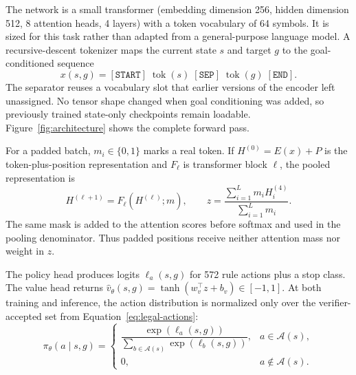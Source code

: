 \documentclass[11pt]{article}
\numberwithin{equation}{section}
\begin{document}
The network is a small transformer (embedding dimension 256, hidden dimension 512, 8 attention heads, 4 layers) with a token vocabulary of 64 symbols. It is sized for this task rather than adapted from a general-purpose language model. A recursive-descent tokenizer maps the current state $s$ and target $g$ to the goal-conditioned sequence
\begin{equation}
x(s,g)=[\texttt{START}]\;\operatorname{tok}(s)\;[\texttt{SEP}]\;\operatorname{tok}(g)\;[\texttt{END}].
\label{eq:input-encoding}
\end{equation}
The separator reuses a vocabulary slot that earlier versions of the encoder left unassigned. No tensor shape changed when goal conditioning was added, so previously trained state-only checkpoints remain loadable. Figure~\ref{fig:architecture} shows the complete forward pass.

For a padded batch, $m_i\in\{0,1\}$ marks a real token. If $H^{(0)}=E(x)+P$ is the token-plus-position representation and $F_\ell$ is transformer block $\ell$, the pooled representation is
\begin{equation}
H^{(\ell+1)}=F_\ell\!\left(H^{(\ell)};m\right),\qquad
z=\frac{\sum_{i=1}^{L}m_i H^{(4)}_i}{\sum_{i=1}^{L}m_i}.
\label{eq:masked-pooling}
\end{equation}
The same mask is added to the attention scores before softmax and used in the pooling denominator. Thus padded positions receive neither attention mass nor weight in $z$.

The policy head produces logits $\ell_a(s,g)$ for 572 rule actions plus a stop class. The value head returns $\hat v_\theta(s,g)=\tanh(w_v^\top z+b_v)\in[-1,1]$. At both training and inference, the action distribution is normalized only over the verifier-accepted set from Equation~\eqref{eq:legal-actions}:
\begin{equation}
\pi_\theta(a\mid s,g)=
\begin{cases}
\dfrac{\exp\!\left(\ell_a(s,g)\right)}{\sum_{b\in\mathcal{A}(s)}\exp\!\left(\ell_b(s,g)\right)}, & a\in\mathcal{A}(s),\\[2mm]
0, & a\notin\mathcal{A}(s).
\end{cases}
\label{eq:legal-policy}
\end{equation}
\end{document}
